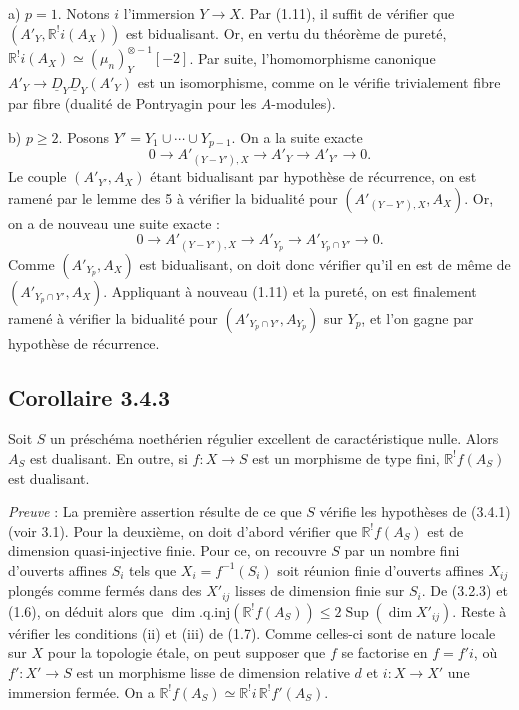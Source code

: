a) $p = 1$. Notons $i$ l'immersion $Y \to X$. Par (1.11), il suffit de vérifier que $(A'_Y, \mathbb{R}^{!}i(A_X))$ est bidualisant. Or, en vertu du théorème de pureté, $\mathbb{R}^{!}i(A_X) \simeq (\mu_n)^{\otimes -1}_Y[-2]$. Par suite, l'homomorphisme canonique $A'_Y \to \underline{D}_Y \underline{D}_Y(A'_Y)$ est un isomorphisme, comme on le vérifie trivialement fibre par fibre (dualité de Pontryagin pour les $A$-modules).

b) $p \geqslant 2$. Posons $Y' = Y_1 \cup \cdots \cup Y_{p-1}$. On a la suite exacte
\[
0 \longrightarrow A'_{(Y-Y'),X} \longrightarrow A'_Y \longrightarrow A'_{Y'} \longrightarrow 0.
\]
Le couple $(A'_{Y'}, A_X)$ étant bidualisant par hypothèse de récurrence, on est ramené par le lemme des 5 à vérifier la bidualité pour $(A'_{(Y-Y'),X}, A_X)$. Or, on a de nouveau une suite exacte :
\[
0 \longrightarrow A'_{(Y-Y'),X} \longrightarrow A'_{Y_p} \longrightarrow A'_{Y_p \cap Y'} \longrightarrow 0.
\]
Comme $(A'_{Y_p}, A_X)$ est bidualisant, on doit donc vérifier qu'il en est de même de $(A'_{Y_p \cap Y'}, A_X)$. Appliquant à nouveau (1.11) et la pureté, on est finalement ramené à vérifier la bidualité pour $(A'_{Y_p \cap Y'}, A_{Y_p})$ sur $Y_p$, et l'on gagne par hypothèse de récurrence.

\subsection*{Corollaire 3.4.3}
Soit $S$ un préschéma noethérien régulier excellent de caractéristique nulle. Alors $A_S$ est dualisant. En outre, si $f : X \to S$ est un morphisme de type fini, $\mathbb{R}^{!}f(A_S)$ est dualisant.

\emph{Preuve} : La première assertion résulte de ce que $S$ vérifie les hypothèses de (3.4.1) (voir 3.1). Pour la deuxième, on doit d'abord vérifier que $\mathbb{R}^{!}f(A_S)$ est de dimension quasi-injective finie. Pour ce, on recouvre $S$ par un nombre fini d'ouverts affines $S_i$ tels que $X_i = f^{-1}(S_i)$ soit réunion finie d'ouverts affines $X_{ij}$ plongés comme fermés dans des $X'_{ij}$ lisses de dimension finie sur $S_i$. De (3.2.3) et (1.6), on déduit alors que $\dim.\mathrm{q.inj}(\mathbb{R}^{!}f(A_S)) \leqslant 2\operatorname{Sup}(\dim X'_{ij})$. Reste à vérifier les conditions (ii) et (iii) de (1.7). Comme celles-ci sont de nature locale sur $X$ pour la topologie étale, on peut supposer que $f$ se factorise en $f = f'i$, où $f' : X' \to S$ est un morphisme lisse de dimension relative $d$ et $i : X \to X'$ une immersion fermée. On a $\mathbb{R}^{!}f(A_S) \simeq \mathbb{R}^{!}i \, \mathbb{R}^{!}f'(A_S)$.

